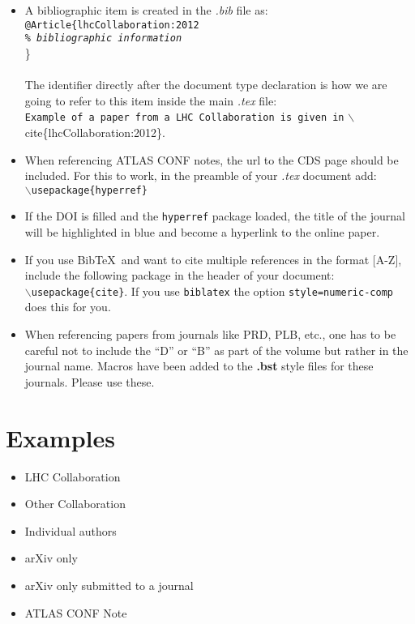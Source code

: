 \documentclass{style/atlasdoc}
\newcommand*{\BibTeX}{Bib\TeX}
\begin{document}
\begin{itemize}
\item A bibliographic item is created in the \emph{.bib} file as: \\
	\texttt{@Article\{lhcCollaboration:2012 \\ \emph{\% bibliographic information}} \\ \} \\
	\\
	The identifier directly after the document type declaration is how we are going to refer to this item inside the main \emph{.tex} file: \\
	{\small{\texttt{Example of a paper from a LHC Collaboration is given in} $\backslash$cite\{lhcCollaboration:2012\}.}}
\item When referencing ATLAS CONF notes, the url to the CDS page should be included. For this to work, in the preamble of your \emph{.tex} document add: \\
	\texttt{$\backslash$usepackage\{hyperref\}}
\item If the DOI is filled and the \texttt{hyperref} package loaded, the title of the journal will be highlighted in blue and become a hyperlink to the online paper.
\item If you use \BibTeX\ and want to cite multiple references in the format [A-Z], include the following package in the 	header of your document: \\
	\texttt{$\backslash$usepackage\{cite\}}.
	If you use \texttt{biblatex} the option \texttt{style=numeric-comp} does this for you.
\item When referencing papers from journals like PRD, PLB, etc.,
	one has to be careful not to include the ``D'' or ``B'' as part of the volume but rather in the journal name. 
	Macros have been added to the \textbf{.bst} style files for these journals. Please use these.
\end{itemize}


\section{Examples}

\begin{itemize}
	\item LHC Collaboration~\cite{lhcCollaboration:2012}
	\item Other Collaboration~\cite{otherCollaboration:2007}
	\item Individual authors~\cite{authors:2008}
	\item arXiv only~\cite{arxivOnly:2009}
	\item arXiv only submitted to a journal~\cite{arxivSub:2011}
	\item ATLAS CONF Note~\cite{atlasConf:2012} 
\end{itemize}
\end{document}

